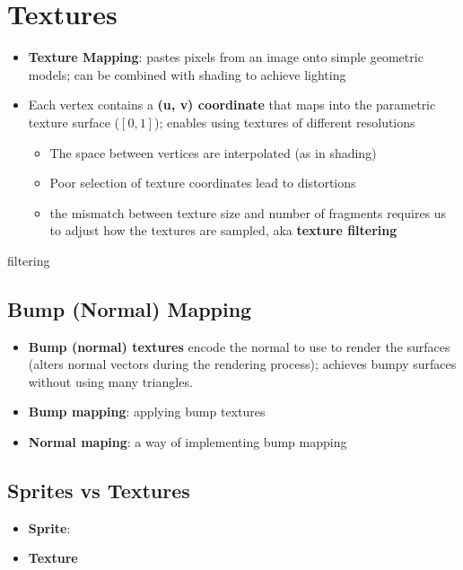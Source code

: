 \chapter{Textures}

\begin{itemize}
  \item \textbf{Texture Mapping}: pastes pixels from an image onto
  simple geometric models; can be combined with shading to achieve lighting
  \item Each vertex contains a \textbf{(u, v) coordinate} that maps into the
  parametric texture surface ($ \left[ 0, 1 \right] $); enables using
  textures of different resolutions
  \begin{itemize}
    \item The space between vertices are interpolated (as in shading)
    \item Poor selection of texture coordinates lead to distortions
    \item the mismatch between texture size and number of fragments requires us
    to adjust how the textures are sampled, aka \textbf{texture filtering}
  \end{itemize}
\end{itemize}

{filtering}

\section{Bump (Normal) Mapping}

  \begin{itemize}
    \item \textbf{Bump (normal) textures} encode the normal to use to render the
    surfaces (alters normal vectors during the rendering process);
    achieves bumpy surfaces without using many triangles.
    \item \textbf{Bump mapping}: applying bump textures
    \item \textbf{Normal maping}: a way of implementing bump mapping
  \end{itemize}

\section{Sprites vs Textures}

  \begin{itemize}
    \item \textbf{Sprite}:
    \item \textbf{Texture}
  \end{itemize}

